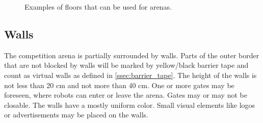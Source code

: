\begin{figure} [h!]
\begin{center}
 \hspace{0.1cm}
 \hspace{0.1cm}
 \hspace{0.1cm}
 \hspace{0.1cm}
\end{center}
\caption{Examples of floors that can be used for \RCAW arenas.}
\label{fig:example_floors}
\end{figure}

\subsection{Walls}
The competition arena is partially surrounded by walls. Parts of the outer border that are not blocked by walls will be marked by yellow/black barrier tape and count as virtual walls as defined in \ref{ssec:barrier_tape}. The height of the walls is not less than 20 cm and not more than 40 cm. One or more gates may be foreseen, where robots can enter or leave the arena. Gates may or may not be closable. The walls have a mostly uniform color. Small visual elements like logos or advertisements may be placed on the walls.


